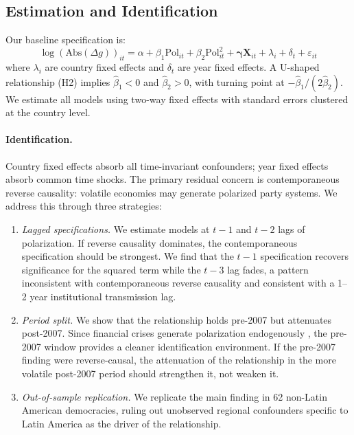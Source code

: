 \documentclass[12pt]{article}
\begin{document}
\subsection{Estimation and Identification}

Our baseline specification is:
\[
\log(\text{Abs}(\Delta g))_{it} = \alpha + \beta_1 \text{Pol}_{it} +
\beta_2 \text{Pol}^2_{it} + \boldsymbol{\gamma}\mathbf{X}_{it} +
\lambda_i + \delta_t + \varepsilon_{it}
\]
where $\lambda_i$ are country fixed effects and $\delta_t$ are year fixed
effects. A U-shaped relationship (H2) implies $\hat{\beta}_1 < 0$ and
$\hat{\beta}_2 > 0$, with turning point at $-\hat{\beta}_1 / (2\hat{\beta}_2)$.
We estimate all models using two-way fixed effects with standard errors
clustered at the country level.

\paragraph{Identification.} Country fixed effects absorb all time-invariant
confounders; year fixed effects absorb common time shocks. The primary
residual concern is contemporaneous reverse causality: volatile economies
may generate polarized party systems. We address this through three
strategies:

\begin{enumerate}[leftmargin=*, label=(\roman*)]
  \item \textit{Lagged specifications.} We estimate models at $t-1$ and
  $t-2$ lags of polarization. If reverse causality dominates, the
  contemporaneous specification should be strongest. We find that the
  $t-1$ specification recovers significance for the squared term while the
  $t-3$ lag fades, a pattern inconsistent with contemporaneous reverse
  causality and consistent with a 1--2 year institutional transmission lag.

  \item \textit{Period split.} We show that the relationship holds
  pre-2007 but attenuates post-2007. Since financial crises generate
  polarization endogenously \citep{FunkeST2016}, the pre-2007 window
  provides a cleaner identification environment. If the pre-2007
  finding were reverse-causal, the attenuation of the relationship
  in the more volatile post-2007 period should strengthen it, not weaken it.

  \item \textit{Out-of-sample replication.} We replicate the main
  finding in 62 non-Latin American democracies, ruling out
  unobserved regional confounders specific to Latin America as the
  driver of the relationship.
\end{enumerate}
\end{document}
